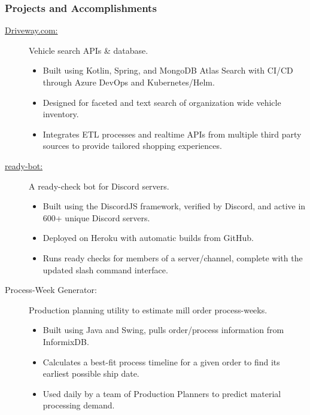 \documentclass{article}
\begin{document}
\subsubsection*{Projects and Accomplishments}
    \begin{description}

        \item[\href{https://driveway.com/shop}{Driveway.com:\hspace{0.075in}}] Vehicle search APIs \& database.
            \begin{itemize}
                \item Built using Kotlin, Spring, and MongoDB Atlas Search with CI/CD through Azure DevOps and Kubernetes/Helm.
                \item Designed for faceted and text search of organization wide vehicle inventory.
                \item Integrates ETL processes and realtime APIs from multiple third party sources to provide tailored shopping experiences.
            \end{itemize}

            \vspace{0.5em}
        \item[\href{https://www.github.com/BurnsCommaLucas/ready-bot}{ready-bot:\hspace{0.075in}}] A ready-check bot for Discord servers.
            \begin{itemize}
                \item Built using the DiscordJS framework, verified by Discord, and active in 600+ unique Discord servers.
                \item Deployed on Heroku with automatic builds from GitHub.
                \item Runs ready checks for members of a server/channel, complete with the updated slash command interface.
            \end{itemize}

            \vspace{0.5em}

        \item[Process-Week Generator:] Production planning utility to estimate mill order process-weeks.
            \begin{itemize}
                \item Built using Java and Swing, pulls order/process information from InformixDB.
                \item Calculates a best-fit process timeline for a given order to find its earliest possible ship date.
                \item Used daily by a team of Production Planners to predict material processing demand.
            \end{itemize}


\end{description}
\end{document}
